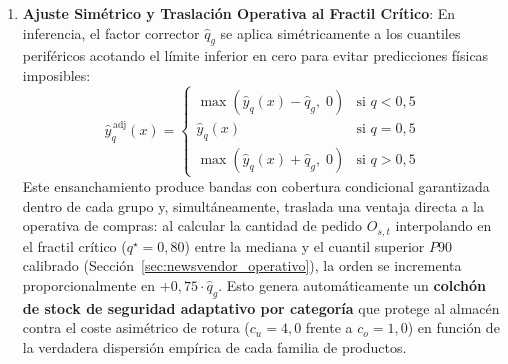 \begin{enumerate}
    \item \textbf{Ajuste Simétrico y Traslación Operativa al Fractil Crítico}: En inferencia, el factor corrector $\hat{q}_g$ se aplica simétricamente a los cuantiles periféricos acotando el límite inferior en cero para evitar predicciones físicas imposibles:
    \begin{equation}
        \hat{y}_{q}^{\,\text{adj}}(x) =
        \begin{cases}
            \max\!\left(\hat{y}_q(x) - \hat{q}_g,\; 0\right) & \text{si } q < 0{,}5 \\
            \hat{y}_q(x) & \text{si } q = 0{,}5 \\
            \max\!\left(\hat{y}_q(x) + \hat{q}_g,\; 0\right) & \text{si } q > 0{,}5
        \end{cases}
    \end{equation}
    Este ensanchamiento produce bandas con cobertura condicional garantizada dentro de cada grupo y, simultáneamente, traslada una ventaja directa a la operativa de compras: al calcular la cantidad de pedido $O_{s,t}$ interpolando en el fractil crítico ($q^\star = 0{,}80$) entre la mediana y el cuantil superior $P90$ calibrado (Sección~\ref{sec:newsvendor_operativo}), la orden se incrementa proporcionalmente en $+0{,}75 \cdot \hat{q}_g$. Esto genera automáticamente un \textbf{colchón de stock de seguridad adaptativo por categoría} que protege al almacén contra el coste asimétrico de rotura ($c_u = 4{,}0$ frente a $c_o = 1{,}0$) en función de la verdadera dispersión empírica de cada familia de productos.
\end{enumerate}

